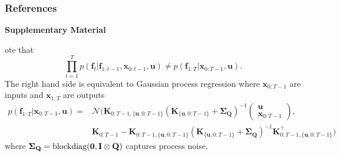 \documentclass{article} %
\newcommand{\n}[1]{\mathbf{#1}}
\newcommand{\x}{\mathbf{x}}
\newcommand{\bSigma}{\boldsymbol\Sigma}
\begin{document}















\newpage
\subsubsection*{References}

\begingroup
\renewcommand{\section}[2]{} %
\small

\endgroup



\newpage
\appendix

\begin{center}
\Large \bf Supplementary Material
\end{center}


\section{Remark on $p(\n{f} | \x)$}
Note that
\begin{equation}
\label{eq:cautionnote}
	\prod_{t=1}^T p(\n{f}_t | \n{f}_{1:t-1},\x_{0:t-1},\n{u}) \neq p(\n{f}_{1:T} | \x_{0:T-1},\n{u}).
\end{equation}
The right hand side is equivalent to Gaussian process regression where $\x_{0:T-1}$ are inputs and $\x_{1:T}$ are outputs
\begin{align}
	p(\n{f}_{1:T} | \x_{0:T-1},\n{u}) =& \mathcal{N}\big(\n{K}_{0:T-1,\{\n{u},0:T-1\}} (\n{K}_{\{\n{u},0:T-1\}}+\bSigma_{\n{Q}})^{-1} \begin{pmatrix} \n{u} \\ \x_{0:T-1} \end{pmatrix} , \nonumber \\ 
	 & \n{K}_{0:T-1} - \n{K}_{0:T-1,\{\n{u},0:T-1\}} (\n{K}_{\{\n{u},0:T-1\}}+\bSigma_{\n{Q}})^{-1}  \n{K}_{0:T-1,\{\n{u},0:T-1\}}^\top \big)
\end{align}
where $\bSigma_{\n{Q}} = {\rm blockdiag}(\n{0},\n{I} \otimes \n{Q})$ captures process noise. 
\end{document}
